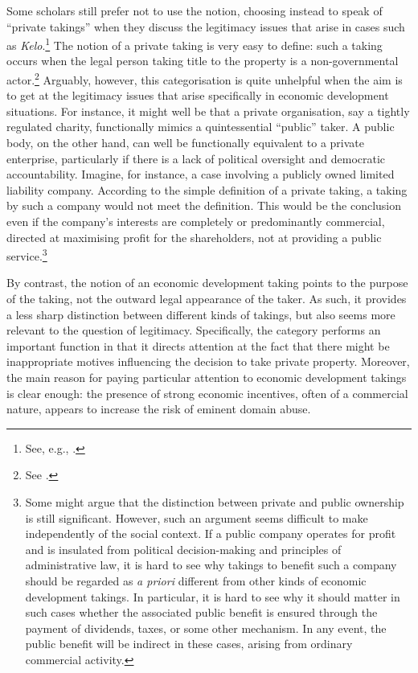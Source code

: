 Some scholars still prefer not to use the notion, choosing instead to speak of ``private takings'' when they discuss the legitimacy issues that arise in cases such as {\it Kelo}.\footnote{See, e.g., \cite{bell09}.} The notion of a private taking is very easy to define: such a taking occurs when the legal person taking title to the property is a non-governmental actor.\footnote{See \cite[519]{bell09}.} Arguably, however, this categorisation is quite unhelpful when the aim is to get at the legitimacy issues that arise specifically in economic development situations. For instance, it might well be that a private organisation, say a tightly regulated charity, functionally mimics a quintessential ``public'' taker. A public body, on the other hand, can well be functionally equivalent to a private enterprise, particularly if there is a lack of political oversight and democratic accountability. Imagine, for instance, a case involving a publicly owned limited liability company. According to the simple definition of a private taking, a taking by such a company would not meet the definition. This would be the conclusion even if the company's interests are completely or predominantly commercial, directed at maximising profit for the shareholders, not at providing a public service.\footnote{Some might argue that the distinction between private and public ownership is still significant. However, such an argument seems difficult to make independently of the social context. If a public company operates for profit and is insulated from political decision-making and principles of administrative law, it is hard to see why takings to benefit such a company should be regarded as {\it a priori} different from other kinds of economic development takings. In particular, it is hard to see why it should matter in such cases whether the associated public benefit is ensured through the payment of dividends, taxes, or some other mechanism. In any event, the public benefit will be indirect in these cases, arising from ordinary commercial activity.}

By contrast, the notion of an economic development taking points to the purpose of the taking, not the outward legal appearance of the taker. As such, it provides a less sharp distinction between different kinds of takings, but also seems more relevant to the question of legitimacy. Specifically, the category performs an important function in that it directs attention at the fact that there might be  inappropriate motives influencing the decision to take private property. Moreover, the main reason for paying particular attention to economic development takings is clear enough: the presence of strong economic incentives, often of a commercial nature, appears to increase the risk of eminent domain abuse.

